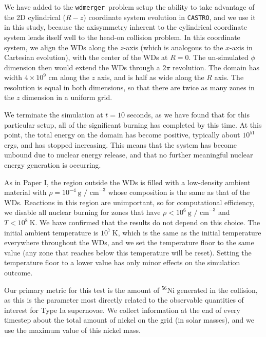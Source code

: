 \documentclass[twocolumn,numberedappendix]{../aastex6}
\newcommand{\castro}{\texttt{CASTRO}}
\newcommand{\wdmerger}{\texttt{wdmerger}}
\begin{document}
We have added to the \wdmerger\ problem setup the ability to take advantage of 
the 2D cylindrical ($R-z$) coordinate system evolution in \castro, and we use it
in this study, because the axisymmetry inherent to the cylindrical coordinate system
lends itself well to the head-on collision problem. In this coordinate system, we
align the WDs along the $z$-axis (which is analogous to the $x$-axis in Cartesian
evolution), with the center of the WDs at $R = 0$. The un-simulated $\phi$ dimension
then would extend the WDs through a $2\pi$ revolution. The domain has width $4 \times 10^{9}$
cm along the $z$ axis, and is half as wide along the $R$ axis. The resolution is equal
in both dimensions, so that there are twice as many zones in the $z$ dimension in
a uniform grid.

We terminate the simulation at $t = 10$ seconds, as we have found that for this
particular setup, all of the significant burning has completed by this time. At
this point, the total energy on the domain has become positive, typically about
$10^{51}$ ergs, and has stopped increasing. This means that the system has become
unbound due to nuclear energy release, and that no further meaningful nuclear energy
generation is occurring.

As in Paper I, the region outside the WDs is filled with a low-density ambient
material with $\rho = 10^{-4}\ \text{g / cm}^{-3}$ whose composition is the
same as that of the WDs. Reactions in this region are unimportant, so for
computational efficiency, we disable all nuclear burning for zones that have
$\rho < 10^6\ \text{g / cm}^{-3}$ and $T < 10^8\ \text{K}$. We have confirmed that
the results do not depend on this choice. The initial ambient
temperature is $10^7\ \text{K}$, which is the same as the initial temperature
everywhere throughout the WDs, and we set the temperature floor to the same
value (any zone that reaches below this temperature will be reset). Setting the
temperature floor to a lower value has only minor effects on the simulation outcome.

Our primary metric for this test is the amount of $^{56}$Ni generated in the collision,
as this is the parameter most directly related to the observable quantities of interest
for Type Ia supernovae. We collect information at the end of every timestep about the
total amount of nickel on the grid (in solar masses), and we use the maximum value of
this nickel mass.



\end{document}
